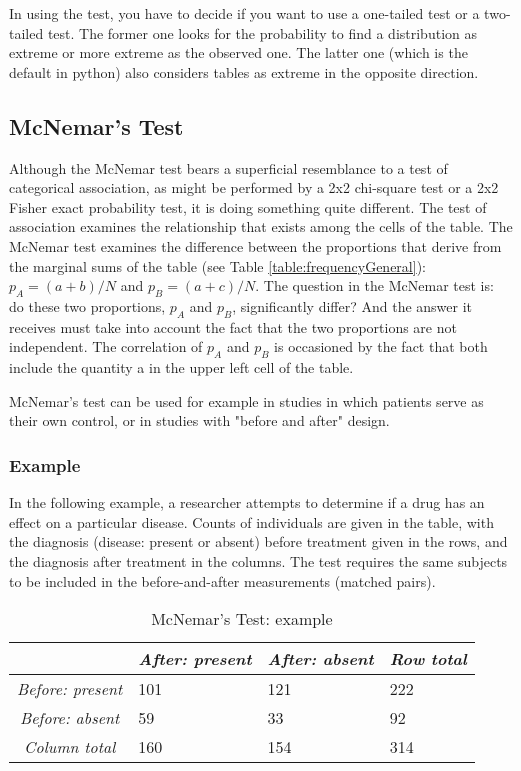 In using the test, you have to decide if you want to use a one-tailed test or a two-tailed test. The former one looks for the probability to find a distribution as extreme or more extreme as the observed one. The latter one (which is the default in python) also considers tables as extreme in the opposite direction.

\subsection{McNemar's Test}

Although the McNemar test bears a superficial resemblance to a test of categorical association, as might be performed by a 2x2 chi-square test or a 2x2 Fisher exact probability test, it is doing something quite different. The test of association examines the relationship that exists among the cells of the table. The McNemar test examines the difference between the proportions that derive from the marginal sums of the table (see Table \ref{table:frequencyGeneral}): $p_A=(a+b)/N$ and $p_B=(a+c)/N$. The question in the McNemar test is: do these two proportions, $p_A$ and $p_B$, significantly differ? And the answer it receives must take into account the fact that the two proportions are not independent. The correlation of $p_A$ and $p_B$ is occasioned by the fact that both include the quantity a in the upper left cell of the table.

McNemar's test can be used for example in studies in which patients serve as their own control, or in studies with "before and after" design.

\subsubsection{Example}

In the following example, a researcher attempts to determine if a drug has an effect on a particular disease. Counts of individuals are given in the table, with the diagnosis (disease: present or absent) before treatment given in the rows, and the diagnosis after treatment in the columns. The test requires the same subjects to be included in the before-and-after measurements (matched pairs).

\begin{table}
  \centering
  \begin{tabular}{|c|l l l|}
  \hline
  & \emph{After: present} & \emph{After: absent} & \emph{Row total} \\
  \hline
  \emph{Before: present} & 101 & 121 & 222 \\
  \emph{Before: absent} & 59 & 33 & 92 \\
  \emph{Column total} & 160 & 154 & 314 \\
  \hline
  \end{tabular}

  \caption{McNemar's Test: example}\label{table:McNemarExample}
\end{table}


